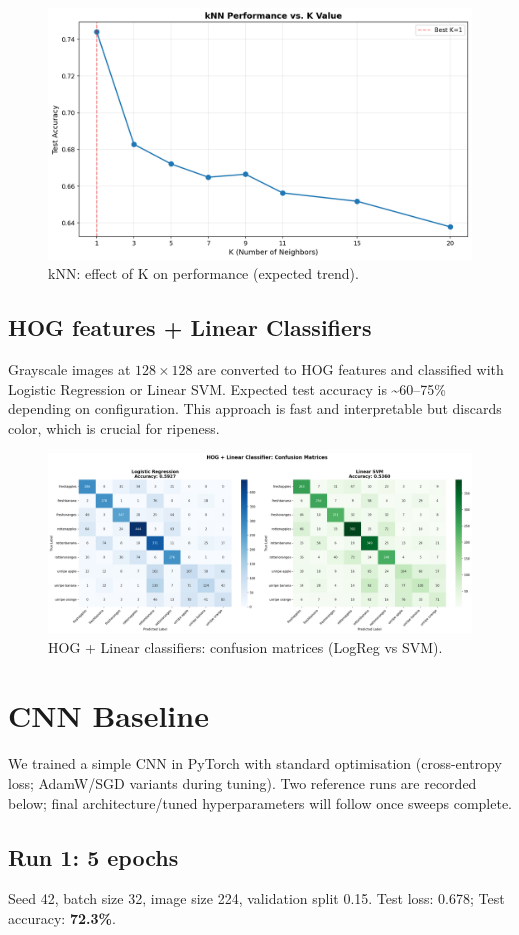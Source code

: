 \documentclass[11pt,a4paper]{article}
\begin{document}
\begin{figure}[H]
  \centering
  \includegraphics[width=0.6\linewidth]{baseline_knn_k_tuning.png}
  \caption{kNN: effect of K on performance (expected trend).}
  \label{fig:knn-k}
\end{figure}

\subsection{HOG features + Linear Classifiers}
Grayscale images at \(128\times128\) are converted to HOG features and classified with Logistic Regression or Linear SVM. Expected test accuracy is \textasciitilde60--75\% depending on configuration. This approach is fast and interpretable but discards color, which is crucial for ripeness.

\begin{figure}[H]
  \centering
  \includegraphics[width=0.75\linewidth]{hog_linear_confusion_matrices.png}
  \caption{HOG + Linear classifiers: confusion matrices (LogReg vs SVM).}
  \label{fig:hog-conf}
\end{figure}

\section{CNN Baseline}
We trained a simple CNN in PyTorch with standard optimisation (cross-entropy loss; AdamW/SGD variants during tuning). Two reference runs are recorded below; final architecture/tuned hyperparameters will follow once sweeps complete.

\subsection{Run 1: 5 epochs}
Seed 42, batch size 32, image size 224, validation split 0.15.\newline
Test loss: 0.678; Test accuracy: \textbf{72.3\%}.
\end{document}
